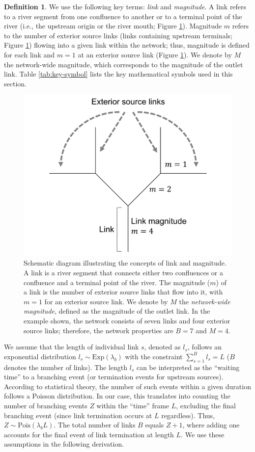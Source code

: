 \documentclass[11pt, class=article, crop=false]{standalone}
\theoremstyle{definition}
\newtheorem{definition}{Definition}[subsection]
\begin{document}
\begin{definition}
We use the following key terms: \textit{link} and \textit{magnitude}.
A link refers to a river segment from one confluence to another or to a terminal point of the river (i.e., the upstream origin or the river mouth; Figure \ref{fig:river-fig}).
Magnitude $m$ refers to the number of exterior source links (links containing upstream terminals; Figure \ref{fig:river-fig}) flowing into a given link within the network; thus, magnitude is defined for each link and $m=1$ at an exterior source link (Figure \ref{fig:river-fig}).
We denote by $M$ the network-wide magnitude, which corresponds to the magnitude of the outlet link.
Table \ref{tab:key-symbol} lists the key mathematical symbols used in this section.

\noindent\makebox[\linewidth]{\rule{\textwidth}{0.4pt}}

\begin{figure}
    \includegraphics[width=0.45\linewidth]{tex/fig_si_mag.pdf}
    \caption{Schematic diagram illustrating the concepts of link and magnitude. A link is a river segment that connects either two confluences or a confluence and a terminal point of the river. The magnitude ($m$) of a link is the number of exterior source links that flow into it, with $m=1$ for an exterior source link. We denote by $M$ the \textit{network-wide magnitude}, defined as the magnitude of the outlet link. In the example shown, the network consists of seven links and four exterior source links; therefore, the network properties are $B=7$ and $M=4$.}
    \label{fig:river-fig}
\end{figure}

\noindent\makebox[\linewidth]{\rule{\textwidth}{0.4pt}}

We assume that the length of individual link $s$, denoted as $l_s$, follows an exponential distribution $l_s \sim \mbox{Exp}(\lambda_b)$ with the constraint $\sum_{s = 1}^{B} l_s = L$ ($B$ denotes the number of links).
The length $l_s$ can be interpreted as the ``waiting time'' to a branching event (or termination events for upstream sources).
According to statistical theory, the number of such events within a given duration follows a Poisson distribution.
In our case, this translates into counting the number of branching events $Z$ within the ``time'' frame $L$, excluding the final branching event (since link termination occurs at $L$ regardless).
Thus, $Z \sim \mbox{Pois}(\lambda_b L)$.
The total number of links $B$ equals $Z + 1$, where adding one accounts for the final event of link termination at length $L$.
We use these assumptions in the following derivation.


\end{definition}
\end{document}
